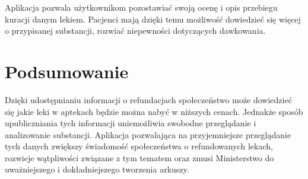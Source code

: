 \documentclass{article}
\begin{document}
  Aplikacja pozwala użytkownikom pozostawiać swoją ocenę i opis przebiegu kuracji danym lekiem.
  Pacjenci mają dzięki temu możliwość dowiedzieć się więcej o przypisanej substancji, rozwiać niepewności dotyczących dawkowania.


  \section{Podsumowanie}

  Dzięki udostępnianiu informacji o refundacjach społeczeństwo może dowiedzieć się jakie leki w aptekach będzie można nabyć w niższych cenach.
  Jednakże sposób upubliczniania tych informacji uniemożliwia swobodne przeglądanie i analizowanie substancji.
  Aplikacja pozwalająca na przyjemniejsze przeglądanie tych danych zwiększy świadomość społeczeństwa o refundowanych lekach, rozwieje wątpliwości związane z tym tematem oraz zmusi Ministerstwo do uważniejszego i dokładniejszego tworzenia arkuszy.
\end{document}
